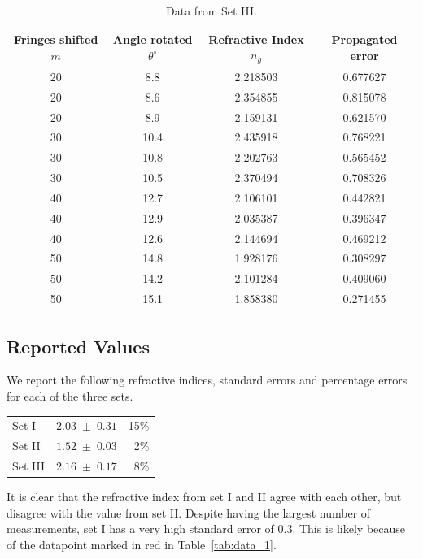 \documentclass[11pt]{article}
\begin{document}
        \begin{table}[H]
                \centering
                \caption{Data from Set III.}
                \begin{tabular}{c|c|c|c}\hline
                Fringes shifted $m$&  Angle rotated $\theta^\circ$ &  Refractive Index $n_g$&     Propagated error \\\hline\hline
                    20 &            8.8 &          2.218503 &  0.677627 \\
                    20 &            8.6 &          2.354855 &  0.815078 \\
                    20 &            8.9 &          2.159131 &  0.621570 \\
                    30 &           10.4 &          2.435918 &  0.768221 \\
                    30 &           10.8 &          2.202763 &  0.565452 \\
                    30 &           10.5 &          2.370494 &  0.708326 \\
                    40 &           12.7 &          2.106101 &  0.442821 \\
                    40 &           12.9 &          2.035387 &  0.396347 \\
                    40 &           12.6 &          2.144694 &  0.469212 \\
                    50 &           14.8 &          1.928176 &  0.308297 \\
                    50 &           14.2 &          2.101284 &  0.409060 \\
                    50 &           15.1 &          1.858380 &  0.271455 \\
                \hline
                \end{tabular}
                \label{tab:data_3}
        \end{table}

        \subsection{Reported Values}
        We report the following refractive indices, standard errors and percentage errors for each of the three sets.
        \begin{center}
                \begin{tabular}{lcr}
                        Set I   & $2.03 \;\pm\; 0.31$ & 15\%\\
                        Set II  & $1.52 \;\pm\; 0.03$ &  2\%\\
                        Set III & $2.16 \;\pm\; 0.17$ &  8\%
                \end{tabular}
        \end{center}
        It is clear that the refractive index from set I and II agree with each other, but disagree with the value from set II.
        Despite having the largest number of measurements, set I has a very high standard error of $0.3$. This is likely because of
        the datapoint marked in red in Table~\ref{tab:data_1}.
        
\end{document}
